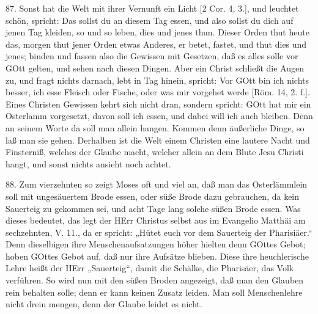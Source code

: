 87. Sonst hat die Welt mit ihrer Vernunft ein Licht [2 Cor. 4, 3.], und leuchtet schön, spricht: Das sollst du an diesem Tag essen, und also sollst du dich auf jenen Tag kleiden, so und so leben, dies und jenes thun. Dieser Orden thut heute das, morgen thut jener Orden etwas Anderes, er betet, fastet, und thut dies und jenes; binden und fassen also die Gewissen mit Gesetzen, daß es alles solle vor GOtt gelten, und sehen nach diesen Dingen. Aber ein Christ schließt die Augen zu, und fragt nichts darnach, lebt in Tag hinein, spricht: Vor GOtt bin ich nichts besser, ich esse Fleisch oder Fische, oder was mir vorgehet werde [Röm. 14, 2. f.]. Eines Christen Gewissen kehrt sich nicht dran, sondern spricht: GOtt hat mir ein Osterlamm vorgesetzt, davon soll ich essen, und dabei will ich auch bleiben. Denn an seinem Worte da soll man allein hangen. Kommen denn äußerliche Dinge, so laß man sie gehen. Derhalben ist die Welt einem Christen eine lautere Nacht und Finsterniß, welches der Glaube macht, welcher allein an dem Blute Jesu Christi hangt, und sonst nichts ansieht noch achtet.

88. Zum vierzehnten so zeigt Moses oft und viel an, daß man das Osterlämmlein soll mit ungesäuertem Brode essen, oder süße Brode dazu gebrauchen, da kein Sauerteig zu gekommen sei, und acht Tage lang solche süßen Brode essen. Was dieses bedeutet, das legt der HErr Christus selbst aus im Evangelio Matthäi am sechzehnten, V. 11., da er spricht: „Hütet euch vor dem Sauerteig der Pharisiäer.“ Denn dieselbigen ihre Menschenaufsatzungen höher hielten denn GOttes Gebot; hoben GOttes Gebot auf, daß nur ihre Aufsätze blieben. Diese ihre heuchlerische Lehre heißt der HErr „Sauerteig“, damit die Schälke, die Pharisäer, das Volk verführen. So wird nun mit den süßen Broden angezeigt, daß man den Glauben rein behalten solle; denn er kann keinen Zusatz leiden. Man soll Menschenlehre nicht drein mengen, denn der Glaube leidet es nicht.

